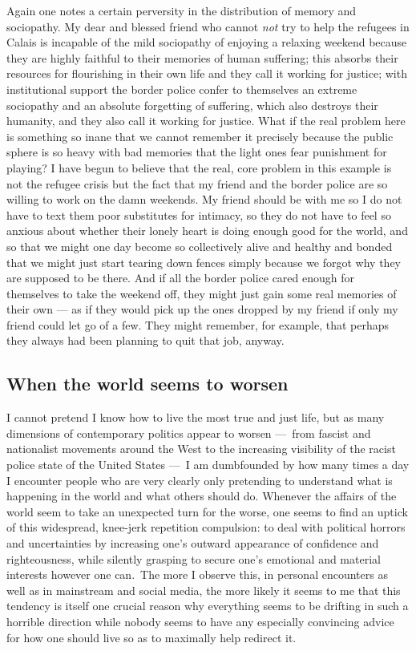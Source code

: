 \documentclass[a4paper,12pt,margin=.5in]{article}
\begin{document}
Again one notes a certain perversity in the distribution of memory and
sociopathy. My dear and blessed friend who cannot \emph{not} try to help
the refugees in Calais is incapable of the mild sociopathy of enjoying a
relaxing weekend because they are highly faithful to their memories of
human suffering; this absorbs their resources for flourishing in their
own life and they call it working for justice; with institutional
support the border police confer to themselves an extreme sociopathy and
an absolute forgetting of suffering, which also destroys their humanity,
and they also call it working for justice. What if the real problem here
is something so inane that we cannot remember it precisely because the
public sphere is so heavy with bad memories that the light ones fear
punishment for playing? I have begun to believe that the real, core
problem in this example is not the refugee crisis but the fact that my
friend and the border police are so willing to work on the damn
weekends. My friend should be with me so I do not have to text them poor
substitutes for intimacy, so they do not have to feel so anxious about
whether their lonely heart is doing enough good for the world, and so
that we might one day become so collectively alive and healthy and
bonded that we might just start tearing down fences simply because we
forgot why they are supposed to be there. And if all the border police
cared enough for themselves to take the weekend off, they might just
gain some real memories of their own --- as if they would pick up the
ones dropped by my friend if only my friend could let go of a few. They
might remember, for example, that perhaps they always had been planning
to quit that job, anyway.

\subsection{When the world seems to
worsen}\label{when-the-world-seems-to-worsen}

I cannot pretend I know how to live the most true and just life, but as
many dimensions of contemporary politics appear to worsen ---~from
fascist and nationalist movements around the West to the increasing
visibility of the racist police state of the United States ---~I am
dumbfounded by how many times a day I encounter people who are very
clearly only pretending to understand what is happening in the world and
what others should do. Whenever the affairs of the world seem to take an
unexpected turn for the worse, one seems to find an uptick of this
widespread, knee-jerk repetition compulsion: to deal with political
horrors and uncertainties by increasing one's outward appearance of
confidence and righteousness, while silently grasping to secure one's
emotional and material interests however one can.~The more I observe
this, in personal encounters as well as in mainstream and social media,
the more likely it seems to me that this tendency is itself one crucial
reason why everything seems to be drifting in such a horrible direction
while nobody seems to have any especially convincing advice for how one
should live so as to maximally help redirect it.
\end{document}

